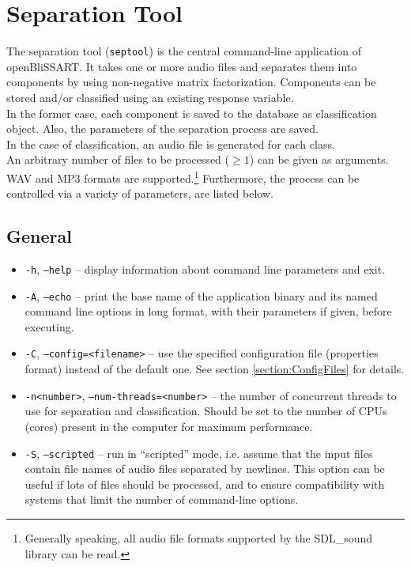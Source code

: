 \section{Separation Tool}
\label{section:septool}

The separation tool (\verb!septool!) is the central command-line application of
openBliSSART. It takes one or more audio files and separates
them into components by using non-negative matrix factorization.  Components can
be stored and/or classified using an existing response variable.\\
In the former case, each component is saved to the database as classification
object. Also, the parameters of the separation process are saved.\\
In the case of classification, an audio file is generated for each class.\\

An arbitrary number of files to be processed ($\geq 1$) can be given as
arguments. WAV and MP3 formats are supported.\footnote{Generally speaking, all
  audio file formats supported by the SDL\_sound library can be read.}
Furthermore, the process can be controlled via a variety of parameters,
are listed below.

\subsection{General}

\begin{itemize}
  \item {\tt -h}, {\tt --help} -- display information about command line
    parameters and exit.
  \item {\tt -A}, {\tt --echo} -- print the base name of the application binary
    and its named command line options in long format, with their parameters if 
    given, before executing.
  \item {\tt -C}, {\tt --config=<filename>} -- use the specified configuration
    file (properties format) instead of the default one. See section 
    \ref{section:ConfigFiles} for details.
  \item {\tt -n<number>}, {\tt --num-threads=<number>} -- the number of
    concurrent threads to use for separation and classification. Should be set
    to the number of CPUs (cores) present in the computer for maximum
    performance.
  \item {\tt -S}, {\tt --scripted} -- run in ``scripted'' mode, i.e. assume that
    the input files contain file names of audio files separated by
    newlines. This option can be useful if lots of files should be processed,
    and to ensure compatibility with systems that limit the number of
    command-line options.
\end{itemize}

